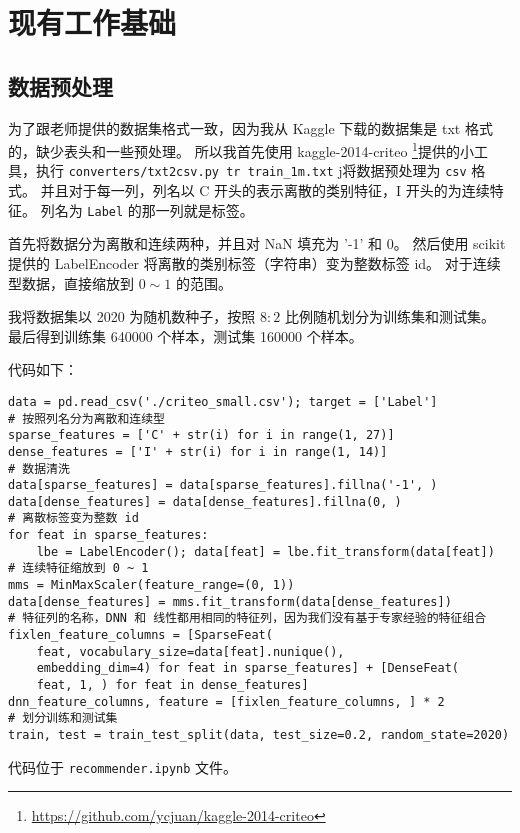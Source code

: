 \documentclass[degree=master,cjk-font=noto]{thuthesis}
\begin{document}
\chapter{现有工作基础}

\section{数据预处理}

为了跟老师提供的数据集格式一致，因为我从 Kaggle 下载的数据集是 txt 格式的，缺少表头和一些预处理。
所以我首先使用 kaggle-2014-criteo \footnote{\url{https://github.com/ycjuan/kaggle-2014-criteo}}提供的小工具，执行 \texttt{converters/txt2csv.py tr train\_1m.txt} j将数据预处理为 \texttt{csv} 格式。
并且对于每一列，列名以 C 开头的表示离散的类别特征，I 开头的为连续特征。
列名为 \texttt{Label} 的那一列就是标签。

首先将数据分为离散和连续两种，并且对 NaN 填充为 '-1' 和 0。
然后使用 scikit 提供的 LabelEncoder 将离散的类别标签（字符串）变为整数标签 id。
对于连续型数据，直接缩放到 $0 \sim 1$ 的范围。

我将数据集以 2020 为随机数种子，按照 $8 : 2$ 比例随机划分为训练集和测试集。
最后得到训练集 640000 个样本，测试集 160000 个样本。

代码如下：

  \begin{verbatim}
data = pd.read_csv('./criteo_small.csv'); target = ['Label']
# 按照列名分为离散和连续型
sparse_features = ['C' + str(i) for i in range(1, 27)]
dense_features = ['I' + str(i) for i in range(1, 14)]
# 数据清洗
data[sparse_features] = data[sparse_features].fillna('-1', )
data[dense_features] = data[dense_features].fillna(0, )
# 离散标签变为整数 id
for feat in sparse_features:
    lbe = LabelEncoder(); data[feat] = lbe.fit_transform(data[feat])
# 连续特征缩放到 0 ~ 1
mms = MinMaxScaler(feature_range=(0, 1))
data[dense_features] = mms.fit_transform(data[dense_features])
# 特征列的名称，DNN 和 线性都用相同的特征列，因为我们没有基于专家经验的特征组合
fixlen_feature_columns = [SparseFeat(
    feat, vocabulary_size=data[feat].nunique(),
    embedding_dim=4) for feat in sparse_features] + [DenseFeat(
    feat, 1, ) for feat in dense_features]
dnn_feature_columns, feature = [fixlen_feature_columns, ] * 2
# 划分训练和测试集
train, test = train_test_split(data, test_size=0.2, random_state=2020)
  \end{verbatim}

代码位于 \texttt{recommender.ipynb} 文件。
\end{document}
